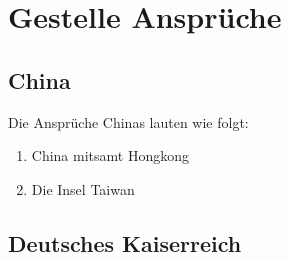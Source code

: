 \documentclass{article}
\begin{document}
\section{Gestelle Ansprüche}

\subsection{China}
Die Ansprüche Chinas lauten wie folgt:
\begin{enumerate}
    \item China mitsamt Hongkong
    \item Die Insel Taiwan
\end{enumerate}

\subsection{Deutsches Kaiserreich}\label{german}
\end{document}
